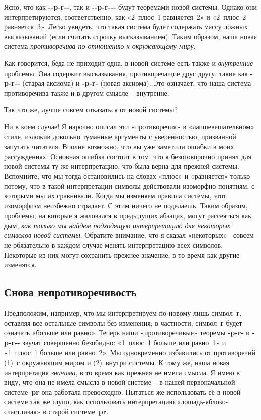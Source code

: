 \documentclass[../main.tex]{subfiles}
\begin{document}
Ясно, что как \textbf{-{}-p-r-{}-}, так и \textbf{-{}-p-r-{}-{}-} будут теоремами новой системы.
Однако они интерпретируются, соответственно, как «2~плюс~1 равняется~2» и «2~плюс~2 равняется~3».
Легко увидеть, что такая система будет содержать массу ложных высказываний (если считать строчку высказыванием).
Таким образом, наша новая система \emph{противоречива по отношению к окружающему миру}.

Как говорится, беда не приходит одна, в новой системе есть также и \emph{внутренние} проблемы. Она содержит высказывания, противоречащие друг другу, такие как \textbf{-p-r-{}-} (старая аксиома) и \textbf{-p-r-} (новая аксиома).
Это означает, что наша система противоречива также и в другом смысле \--- внутренне.

Так что же, лучше совсем отказаться от новой системы?

Ни в коем случае! Я нарочно описал эти «противоречия» в «лапшевешательном» стиле, изложив довольно туманные аргументы с уверенностью, призванной запутать читателя. Вполне возможно, что вы уже заметили ошибки в моих рассуждениях. Основная ошибка состоит в том, что я безоговорочно принял для новой системы ту же интерпретацию, что была верна для прежней системы. Вспомните, что мы тогда остановились на словах «плюс» и «равняется» только потому, что в такой интерпретации символы действовали изоморфно понятиям, с которыми мы их сравнивали. Когда мы изменяем правила системы, этот изоморфизм неизбежно страдает. С этим ничего не поделаешь. Таким образом, проблемы, на которые я жаловался в предыдущих абзацах, могут рассеяться как дым, \emph{как только мы найдем подходящую интерпретацию для некоторых символов новой системы}. Обратите внимание, что я сказал «некоторых» \---совсем не обязательно в каждом случае менять интерпретацию всех символов. Некоторые из них могут сохранить прежнее значение, в то время как другие изменятся.


\subsection{Снова непротиворечивость}

Предположим, например, что мы интерпретируем по-новому лишь символ~\textbf{r}, оставляя все остальные символы без изменения; в частности, символ~\textbf{r} будет означать «больше или равно».
Теперь наши «противоречивые» теоремы \textbf{-p-r-} и \textbf{-p-r-{}-} звучат совершенно безобидно: «1~плюс~1 больше или равно~1» и «1~плюс~1 больше или равно~2».
Мы одновременно избавились от противоречий (1)~с окружающим миром и (2)~внутри системы.
К тому же, наша новая интерпретация \emph{значима}, в то время как прежняя не имела смысла.
Я имею в виду, что она не имела смысла в новой системе \--- в нашей первоначальной системе~\textbf{pr} она работала превосходно.
Пытаться же использовать её в новой системе так же глупо, как использовать интерпретацию «лошадь-яблоко-счастливая» в старой системе~\textbf{pr}.
\end{document}

